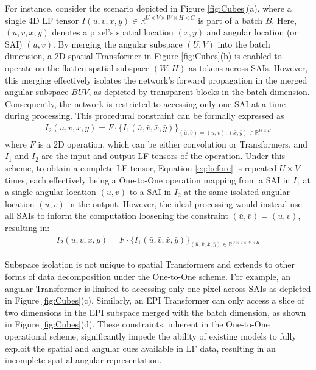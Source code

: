 For instance, consider the scenario depicted in Figure \ref{fig:Cubes}(a), where a single 4D LF tensor $I(u, v, x, y) \in \mathbb{R}^{U \times V \times W \times H \times C}$ is part of a batch $B$. Here, $(u, v, x, y)$ denotes a pixel's spatial location $(x, y)$ and angular location (or SAI) $(u, v)$. By merging the angular subspace $(U, V)$ into the batch dimension, a 2D spatial Transformer in Figure \ref{fig:Cubes}(b) is enabled to operate on the flatten spatial subspace $(W, H)$ as tokens across SAIs. However, this merging effectively isolates the network's forward propagation in the merged angular subspace $BUV$, as depicted by transparent blocks in the batch dimension. Consequently, the network is restricted to accessing only one SAI at a time during processing. This procedural constraint can be formally expressed as
\begin{equation} \label{eq:before}
\begin{split}
    I_{2}(u, v, x, y) = F \cdot \{I_{1}(\bar{u}, \bar{v}, \bar{x}, \bar{y})\}_{(\bar{u}, \bar{v}) = (u, v), (\bar{x}, \bar{y}) \in \mathbb{R}^{W \times H}}
\end{split}
\end{equation}
where $F$ is a 2D operation, which can be either convolution or Transformers, and $I_{1}$ and $I_{2}$ are the input and output LF tensors of the operation. Under this scheme, to obtain a complete LF tensor, Equation \ref{eq:before} is repeated $U \times V$ times, each effectively being a One-to-One operation mapping from a SAI in $I_{1}$ at a single angular location $(u, v)$ to a SAI in $I_{2}$ at the same isolated angular location $(u, v)$ in the output. However, the ideal processing would instead use all SAIs to inform the computation loosening the constraint $(\bar{u}, \bar{v}) = (u, v)$, resulting in:
\begin{equation} \label{eq:after}
\begin{split}
    I_{2}(u, v, x, y) = F \cdot \{I_{1}(\bar{u}, \bar{v}, \bar{x}, \bar{y})\}_{(\bar{u}, \bar{v}, \bar{x}, \bar{y}) \in \mathbb{R}^{U \times V \times W \times H}}
\end{split}
\end{equation}

Subspace isolation is not unique to spatial Transformers and extends to other forms of data decomposition under the One-to-One scheme. For example, an angular Transformer is limited to accessing only one pixel across SAIs as depicted in Figure \ref{fig:Cubes}(c). Similarly, an EPI Transformer can only access a slice of two dimensions in the EPI subspace merged with the batch dimension, as shown in Figure \ref{fig:Cubes}(d). These constraints, inherent in the One-to-One operational scheme, significantly impede the ability of existing models to fully exploit the spatial and angular cues available in LF data, resulting in an incomplete spatial-angular representation.

